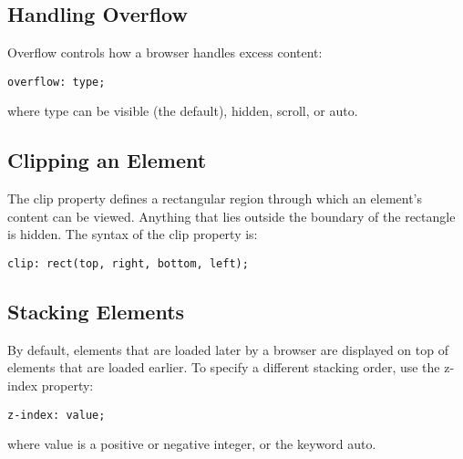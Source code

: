 \documentclass{article}
\begin{document}
\subsection{Handling Overflow}
Overflow controls how a browser handles excess content:
\begin{lstlisting}
overflow: type;
\end{lstlisting}
where type can be visible (the default), hidden, scroll, or auto.

\subsection{Clipping an Element}
The clip property defines a rectangular region through which an element’s content can be viewed. Anything that lies outside the boundary of the rectangle is hidden. The syntax of the clip property is:
\begin{lstlisting}
clip: rect(top, right, bottom, left);
\end{lstlisting}

\subsection{Stacking Elements}
By default, elements that are loaded later by a browser are displayed on top of elements that are loaded earlier. To specify a different stacking order, use the z-index property:
\begin{lstlisting}
z-index: value;
\end{lstlisting}
where value is a positive or negative integer, or the keyword auto.
\end{document}

